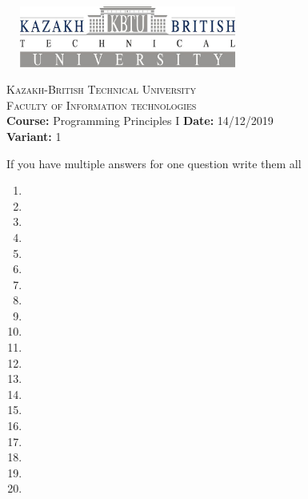 \documentclass[10pt]{article}
\begin{document}
\begin{center}
\includegraphics[width=8cm, height=2cm]{kbtu.jpg}
\end{center}

\begin{center}
	\begin{minipage}{11.4cm}
		\begin{center}
				{\small \textsc{Kazakh-British Technical University}			\\
						  \textsc{Faculty of Information technologies} \\
                         \textbf{Course:} Programming Principles I \hspace{.65cm}\textbf{Date:} 14/12/2019\\\textbf{Variant:} 1\\
                }
		\end{center}
	\end{minipage}
\end{center}

{If you have multiple answers for one question write them all}
\begin{multicols}{5}
\begin{enumerate}
\item \item \item \item \item \item \item \item \item \item \item \item \item \item \item \item \item \item \item \item
\end{enumerate}
\end{multicols}
\end{document}
